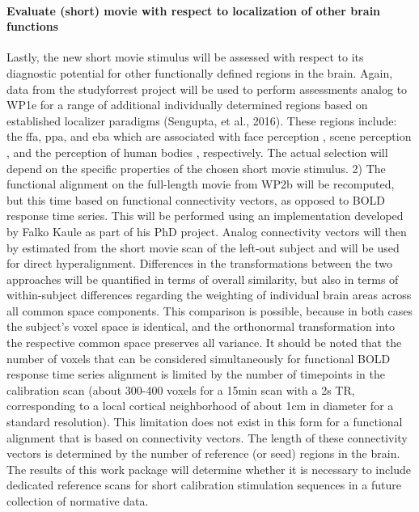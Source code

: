 \paragraph{Evaluate (short) movie with respect to localization of other brain
functions}
%
Lastly, the new short movie stimulus will be assessed with respect to its
diagnostic potential for other functionally defined regions in the brain.
%
Again, data from the studyforrest project will be used to perform assessments
analog to WP1e for a range of additional individually determined regions based
on established localizer paradigms (Sengupta, et al., 2016).
%
These regions include: the \ac{ffa}, \ac{ppa}, and \ac{eba}  which are
associated with face perception \citep{kanwisher1997ffa,
pitcher2011occipitalfacearea}, scene perception \citep{epstein1998ppa}, and the
perception of human bodies \citep{downing2001bodyarea}, respectively.
%
The actual selection will depend on the specific properties of the chosen short
movie stimulus.
%
2) The functional alignment on the full-length movie from WP2b will be
recomputed, but this time based on functional connectivity vectors, as opposed
to BOLD response time series.
%
This will be performed using an implementation developed by Falko Kaule as part
of his PhD project.
%
Analog connectivity vectors will then by estimated from the short movie scan of
the left-out subject and will be used for direct hyperalignment.
%
Differences in the transformations between the two approaches will be quantified
in terms of overall similarity, but also in terms of within-subject differences
regarding the weighting of individual brain areas across all common space
components.
%
This comparison is possible, because in both cases the subject’s voxel space is
identical, and the orthonormal transformation into the respective common space
preserves all variance.
%
It should be noted that the number of voxels that can be considered
simultaneously for functional BOLD response time series alignment is limited by
the number of timepoints in the calibration scan (about 300-400 voxels for a
15min scan with a 2s TR, corresponding to a local cortical neighborhood of about
1cm in diameter for a standard resolution).
%
This limitation does not exist in
this form for a functional alignment that is based on connectivity vectors.
%
The
length of these connectivity vectors is determined by the number of reference
(or seed) regions in the brain.
%
The results of this work package will
determine whether it is necessary to include dedicated reference scans for short
calibration stimulation sequences in a future collection of normative data.


